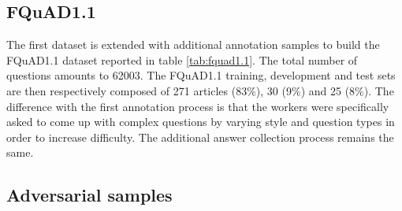 \documentclass{article}
\begin{document}
 
\begin{table}[ht]
    \centering
    \caption{The number of articles, paragraphs and questions for FQuAD1.0}
    \label{tab:fquad1.0}
\end{table}

\subsection{FQuAD1.1}

The first dataset is extended with additional annotation samples to build the FQuAD1.1 dataset reported in table \ref{tab:fquad1.1}. 
The total number of questions amounts to 62003.
The FQuAD1.1 training, development and test sets are then respectively composed of 271 articles (83\%), 30 (9\%) and 25 (8\%).
The difference with the first annotation process is that the workers were specifically asked to come up with complex questions by varying style and question types in order to increase difficulty.
The additional answer collection process remains the same.

\begin{table}[ht]
    \centering
    \caption{The number of articles, paragraphs and questions for FQuAD1.1}
    \label{tab:fquad1.1}
\end{table}

\subsection{Adversarial samples}
\end{document}
